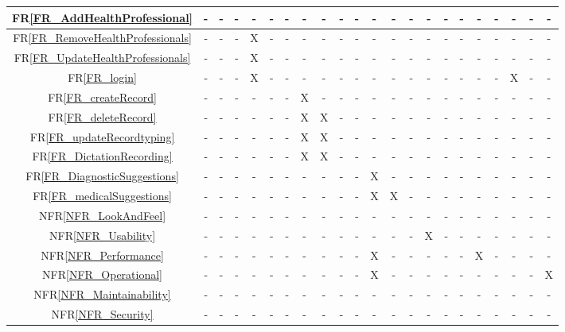 \documentclass[12pt]{article}
\begin{document}
\begin{itemize}
\begin{itemize}
\begin{landscape}
\begin{table}[H]
\begin{tabular}{|c|c|c|c|c|c|c|c|c|c|c|c|c|c|c|c|c|c|c|c|c|c|}
      FR\ref{FR_AddHealthProfessional} & - & - & - & - & - & - & - & - & - & - & - & - & - & - & - & - & - & - & - & - & -  \\ \hline
      FR\ref{FR_RemoveHealthProfessionals} & - & - & - & X & - & - & - & - & - & - & - & - & - & - & - & - & - & - & - & - & -  \\ \hline
      FR\ref{FR_UpdateHealthProfessionals} & - & - & - & X & - & - & - & - & - & - & - & - & - & - & - & - & - & - & - & - & - \\ \hline
      FR\ref{FR_login} & - & - & - & X & - & - & - & - & - & - & - & - & - & - & - & - & - & - & X & - & - \\ \hline
      FR\ref{FR_createRecord} & - & - & - & - & - & - & X & - & - & - & - & - & - & - & - & - & - & - & - & - & - \\ \hline
      FR\ref{FR_deleteRecord} & - & - & - & - & - & - & X & X & - & - & - & - & - & - & - & - & - & - & - & - & - \\ \hline
      FR\ref{FR_updateRecordtyping} & - & - & - & - & - & - & X & X &  - & - & - & - & - & - & - & - & - & - & - & - & - \\ \hline
      FR\ref{FR_DictationRecording} & - & - & - & - & - & - & X & X & - & - & - & - & - & - & - & - & - & - & - & - & - \\ \hline
      FR\ref{FR_DiagnosticSuggestions} & - & - & - & - & - & - & - & - & - & - & X & - & - & - & - & - & - & - & - & - & - \\ \hline
      FR\ref{FR_medicalSuggestions} & - & - & - & - & - & - & - & - & - & - & X & X & - & - & - & - & - & - & - & - & - \\ \hline
      NFR\ref{NFR_LookAndFeel} & - & - & - & - & - & - & - & - & - & - & - & - & -  & - & - & - & - & - & - & - & - \\ \hline
      NFR\ref{NFR_Usability} & - & - & - & - & - & - & - & - & - & - & - & - & - & X & - & - & - & - & - & - & - \\ \hline
      NFR\ref{NFR_Performance} & - & - & - & - & - & - & - & - & - & - & X & - & - & - & - & - & X & - & - & - & - \\ \hline
      NFR\ref{NFR_Operational} & - & - & - & - & - & - & - & - & - & - & X & -  & - & - & - & - & - & - & - & - & X \\ \hline
      NFR\ref{NFR_Maintainability} & - & - & - & - & - & - & - & - & - & - & - & - & - & - & - & - & - & - & - & - & - \\ \hline
      NFR\ref{NFR_Security} & - & - & - & - & - & - & - & - & - & - & - & - & - & - & - & - & - & - & - & - & - \\ \hline

\end{tabular}
\end{table}
\end{landscape}
\end{itemize}
\end{itemize}
\end{document}
